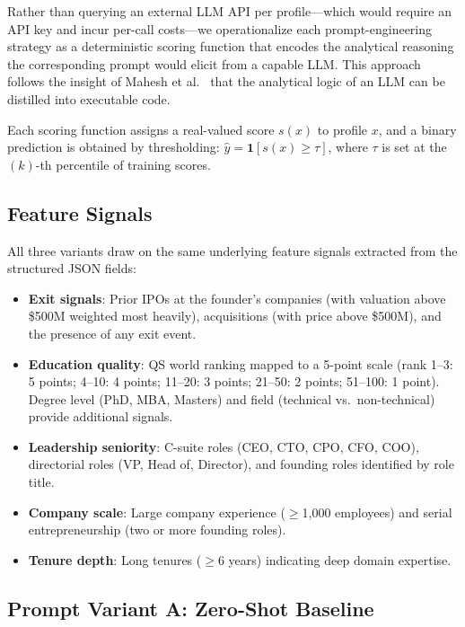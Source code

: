 \documentclass{article}
\begin{document}
Rather than querying an external LLM API per profile---which would require an API key and incur per-call costs---we operationalize each prompt-engineering strategy as a deterministic scoring function that encodes the analytical reasoning the corresponding prompt would elicit from a capable LLM. This approach follows the insight of Mahesh et al.~\cite{mahesh2026stochastic} that the analytical logic of an LLM can be distilled into executable code.

Each scoring function assigns a real-valued score $s(x)$ to profile $x$, and a binary prediction is obtained by thresholding: $\hat{y} = \mathbf{1}[s(x) \geq \tau]$, where $\tau$ is set at the $(k)$-th percentile of training scores.

\subsection{Feature Signals}

All three variants draw on the same underlying feature signals extracted from the structured JSON fields:

\begin{itemize}
  \item \textbf{Exit signals}: Prior IPOs at the founder's companies (with valuation above \$500M weighted most heavily), acquisitions (with price above \$500M), and the presence of any exit event.
  \item \textbf{Education quality}: QS world ranking mapped to a 5-point scale (rank 1--3: 5 points; 4--10: 4 points; 11--20: 3 points; 21--50: 2 points; 51--100: 1 point). Degree level (PhD, MBA, Masters) and field (technical vs.\ non-technical) provide additional signals.
  \item \textbf{Leadership seniority}: C-suite roles (CEO, CTO, CPO, CFO, COO), directorial roles (VP, Head of, Director), and founding roles identified by role title.
  \item \textbf{Company scale}: Large company experience ($\geq$1,000 employees) and serial entrepreneurship (two or more founding roles).
  \item \textbf{Tenure depth}: Long tenures ($\geq$6 years) indicating deep domain expertise.
\end{itemize}

\subsection{Prompt Variant A: Zero-Shot Baseline}
\end{document}
